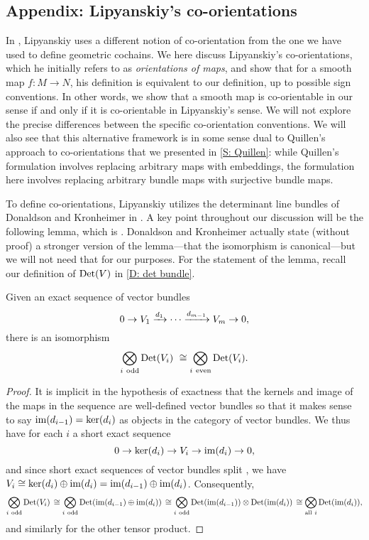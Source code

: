 \subsection{Appendix: Lipyanskiy's co-orientations}\label{S: Lipyanskiy co-orientations}

In \cite{Lipy14}, Lipyanskiy uses a different notion of co-orientation from the one we have used to define geometric cochains.
We here discuss Lipyanskiy's co-orientations, which he initially refers to as \textit{orientations of maps}, and show that for a smooth map $f \colon M \to N$, his definition is equivalent to our definition, up to possible sign conventions.
In other words, we show that a smooth map is co-orientable in our sense if and only if it is co-orientable in Lipyanskiy's sense.
We will not explore the precise differences between the specific co-orientation conventions.
We will also see that this alternative framework is in some sense dual to Quillen's approach to co-orientations that we presented in \cref{S: Quillen}: while Quillen's formulation involves replacing arbitrary maps with embeddings, the formulation here involves replacing arbitrary bundle maps with surjective bundle maps.

To define co-orientations, Lipyanskiy utilizes the determinant line bundles of Donaldson and Kronheimer in \cite[Section 5.2.1]{DoKr90}.
A key point throughout our discussion will be the following lemma, which is \cite[Lemma 5.2.2]{DoKr90}.
Donaldson and Kronheimer actually state (without proof) a stronger version of the lemma---that the isomorphism is canonical---but we will not need that for our purposes.
For the statement of the lemma, recall our definition of ${\rm Det}(V)$ in \cref{D: det bundle}.

\begin{lemma}\label{L: det sequence}
	Given an exact sequence of vector bundles
	\[
	0 \to V_1 \xrightarrow{d_1} \cdots \xrightarrow{d_{m-1}} V_m \to 0,
	\]
	there is an isomorphism
	\[
	\bigotimes_{i\ \text{odd}} {\rm Det}(V_i) \ \cong
	\bigotimes_{i\ \text{even}} {\rm Det}(V_i).
	\]
\end{lemma}

\begin{proof}
	It is implicit in the hypothesis of exactness that the kernels and image of the maps in the sequence are well-defined vector bundles so that it makes sense to say $\text{im}(d_{i-1}) = \ker(d_{i})$ as objects in the category of vector bundles.
	We thus have for each $i$ a short exact sequence
	\[
	0 \to \ker(d_i) \to V_i \to \text{im}(d_i) \to 0,
	\]
	and since short exact sequences of vector bundles split \cite[Theorem 3.9.6]{Hus75}, we have $V_i \cong \ker(d_i) \oplus \text{im}(d_i) = \text{im}(d_{i-1}) \oplus \text{im}(d_i)$.
	Consequently,
	\[
	\bigotimes_{i\ \text{odd}} {\rm Det}(V_i)\, \cong
	\bigotimes_{i\ \text{odd}} {\rm Det}(\text{im}(d_{i-1}) \oplus \text{im}(d_i))\, \cong
	\bigotimes_{i\ \text{odd}} {\rm Det}(\text{im}(d_{i-1})) \otimes {\rm Det}(\text{im}(d_i))\, \cong
	\bigotimes_{\text{all}\ i} {\rm Det}(\text{im}(d_{i})),
	\]
	and similarly for the other tensor product.
\end{proof}

